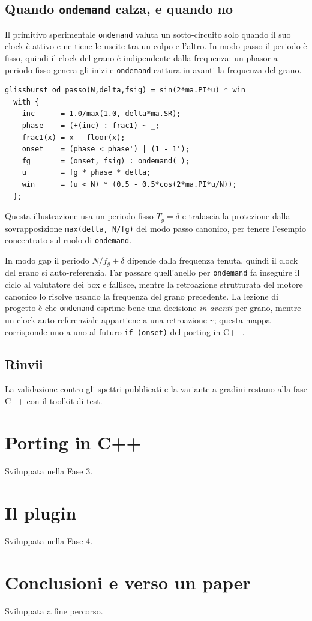 \documentclass[11pt,a4paper]{article}
\begin{document}
\subsection{Quando \texttt{ondemand} calza, e quando no}
Il primitivo sperimentale \texttt{ondemand} valuta un sotto-circuito solo quando il suo clock \`e attivo e ne tiene le uscite tra un colpo e l'altro.
In modo passo il periodo \`e fisso, quindi il clock del grano \`e indipendente dalla frequenza: un phasor a periodo fisso genera gli inizi e \texttt{ondemand} cattura in avanti la frequenza del grano.

\begin{lstlisting}
glissburst_od_passo(N,delta,fsig) = sin(2*ma.PI*u) * win
  with {
    inc      = 1.0/max(1.0, delta*ma.SR);
    phase    = (+(inc) : frac1) ~ _;
    frac1(x) = x - floor(x);
    onset    = (phase < phase') | (1 - 1');
    fg       = (onset, fsig) : ondemand(_);
    u        = fg * phase * delta;
    win      = (u < N) * (0.5 - 0.5*cos(2*ma.PI*u/N));
  };
\end{lstlisting}

Questa illustrazione usa un periodo fisso $T_g = \delta$ e tralascia la protezione dalla sovrapposizione \texttt{max(delta, N/fg)} del modo passo canonico, per tenere l'esempio concentrato sul ruolo di \texttt{ondemand}.

In modo gap il periodo $N/f_g + \delta$ dipende dalla frequenza tenuta, quindi il clock del grano si auto-referenzia.
Far passare quell'anello per \texttt{ondemand} fa inseguire il ciclo al valutatore dei box e fallisce, mentre la retroazione strutturata del motore canonico lo risolve usando la frequenza del grano precedente.
La lezione di progetto \`e che \texttt{ondemand} esprime bene una decisione \emph{in avanti} per grano, mentre un clock auto-referenziale appartiene a una retroazione \texttt{\textasciitilde}; questa mappa corrisponde uno-a-uno al futuro \texttt{if (onset)} del porting in C++.

\subsection{Rinvii}
La validazione contro gli spettri pubblicati e la variante a gradini restano alla fase C++ con il toolkit di test.

\section{Porting in C++}\label{sec:cpp}
Sviluppata nella Fase 3.

\section{Il plugin}\label{sec:plugin}
Sviluppata nella Fase 4.

\section{Conclusioni e verso un paper}\label{sec:conclusioni}
Sviluppata a fine percorso.



\end{document}
